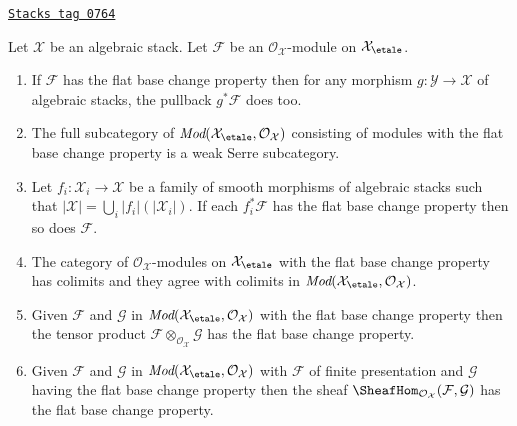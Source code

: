 \begin{lemma}
\label{stacks-cohomology-lemma-check-flat-comparison-on-etale-covering}
\href{https://stacks.math.columbia.edu/tag/0764}{\texttt{Stacks tag 0764}}

Let $\mathcal{X}$ be an algebraic stack. Let $\mathcal{F}$
be an $\mathcal{O}_\mathcal{X}$-module on $\mathcal{X}_\etale$.
\begin{enumerate}
\item If $\mathcal{F}$ has the flat base change property then for any morphism
$g : \mathcal{Y} \to \mathcal{X}$ of algebraic stacks, the
pullback $g^*\mathcal{F}$ does too.
\item The full subcategory of
$\textit{Mod}(\mathcal{X}_\etale, \mathcal{O}_\mathcal{X})$
consisting of modules with the flat base change property
is a weak Serre subcategory.
\item  Let $f_i : \mathcal{X}_i \to \mathcal{X}$ be a family of
smooth morphisms of algebraic stacks such that
$|\mathcal{X}| = \bigcup_i |f_i|(|\mathcal{X}_i|)$. If each
$f_i^*\mathcal{F}$ has the flat base change property then so does
$\mathcal{F}$.
\item The category of $\mathcal{O}_\mathcal{X}$-modules
on $\mathcal{X}_\etale$ with the flat base change property
has colimits and they agree with colimits in
$\textit{Mod}(\mathcal{X}_\etale, \mathcal{O}_\mathcal{X})$.
\item Given $\mathcal{F}$ and $\mathcal{G}$ in
$\textit{Mod}(\mathcal{X}_\etale, \mathcal{O}_\mathcal{X})$
with the flat base change property then the tensor product
$\mathcal{F} \otimes_{\mathcal{O}_\mathcal{X}} \mathcal{G}$
has the flat base change property.
\item Given $\mathcal{F}$ and $\mathcal{G}$ in
$\textit{Mod}(\mathcal{X}_\etale, \mathcal{O}_\mathcal{X})$
with $\mathcal{F}$ of finite presentation and $\mathcal{G}$ having
the flat base change property then the sheaf
$\SheafHom_{\mathcal{O}_\mathcal{X}}(\mathcal{F}, \mathcal{G})$
has the flat base change property.
\end{enumerate}
\end{lemma}

